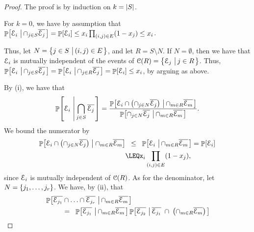 \begin{proof}
    The proof is by induction on $k = \left| {S} \right|$.

    For $k = 0$, we have by assumption that $\Prob{\Event_i \sep{ \cap_{j
             \in S} \overline{\Event_j}}} = \Prob{\Event_i } \leq x_i
    \prod_{(i,j) \in E} \pth{1-x_j} \leq x_i$.
    
    Thus, let $N = \left\{ { j \in S \,\left|\, { (i,j) \in E} \bigr.\right.} \right\}$, and
    let $R = S \setminus N$. If $N = \emptyset$, then we
    have that $\EuScript{E}_i$ is mutually independent of the events of
    $\EuScript{C}(R) = \left\{ {\EuScript{E}_j \,\left|\, { j \in R} \bigr.\right.} \right\}$.  Thus, $\Prob{\Event_i
       \sep{ \cap_{j \in S} \overline{\Event_j}}} = \Prob{\Event_i
       \sep{ \cap_{j \in R} \overline{\Event_j}}} = \Prob{\Event_i}
    \leq x_i$, by arguing as above.
    
    By  (i), we have that    
    \begin{align*}
    \Prob{\Event_i \sep{\bigcap_{j \in S} \overline{\Event_j}}} =
    \frac{\Prob{\Event_i \cap \pth{ \cap_{j \in N}
             \overline{\Event_j} } \sep{ \cap_{m \in R}
             \overline{\Event_m}}}} {\Prob{\cap_{j \in
             N}\overline{\Event_j} \sep{ \cap_{m \in R}
             \overline{\Event_m}} }}.
    \end{align*}
    We bound the numerator by
    \begin{align*}
        \ProbCond{\Event_i \cap \pth{ \cap_{j \in N} \overline{\Event_j} }
        }{ \cap_{m \in R} \overline{\Event_m}}%
        &\LEQ%
        \Prob{\Event_i
           \sep{ \cap_{m \in R} \overline{\Event_m}}} = \Prob{\Event_i}
        \\&
        \LEQ%
        x_i \prod_{(i,j) \in E} \pth{1-x_j},
    \end{align*}   
    since $\EuScript{E}_i$ is mutually independent of $\EuScript{C}(R)$. As for
    the denominator, let $N=\left\{ {j_1, \ldots, j_r} \right\}$. We have, by
     (ii), that
    \begin{align*}
      &\Prob{ \overline{\Event_{j_1}} \cap \ldots \cap
           \overline{\Event_{j_r}} \sep{ \cap_{m \in R}
      \overline{\Event_m}}}
      \\&
      \qquad\EQ
        \Prob{\overline{\Event_{j_1}} \sep{
              \cap_{m \in R} \overline{\Event_m}}}
      \Prob{\overline{\Event_{j_2}} \sep{ \overline{\Event_{j_1}} \;\cap\;
              \pth{ \cap_{m \in R} \overline{\Event_m}}}} \\

\end{align*}
\end{proof}
